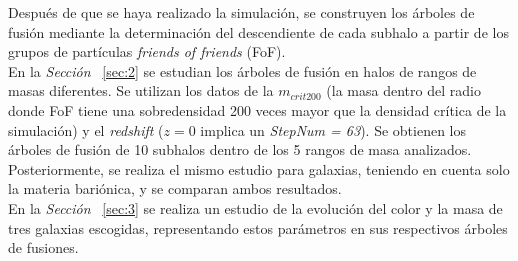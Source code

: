 Después de que se haya realizado la simulación, se construyen los árboles de fusión mediante la determinación del descendiente de cada subhalo a partir de los grupos de partículas \textit{friends of friends} (FoF). \\ 

En la \textit{Sección} ~\ref{sec:2} se estudian los árboles de fusión en halos de rangos de masas diferentes. Se utilizan los datos de la $m_{crit200}$ (la masa dentro del radio donde FoF tiene una sobredensidad 200 veces mayor que la densidad crítica de la simulación) y el \textit{redshift} ($z=0$ implica un \textit{StepNum = 63}). Se obtienen los árboles de fusión de 10 subhalos dentro de los 5 rangos de masa analizados. Posteriormente, se realiza el mismo estudio para galaxias, teniendo en cuenta solo la materia bariónica, y se comparan ambos resultados.\\ 

En la \textit{Sección} ~\ref{sec:3} se realiza un estudio de la evolución del color y la masa de tres galaxias escogidas, representando estos parámetros en sus respectivos árboles de fusiones. 

 























